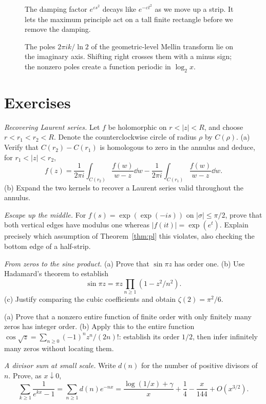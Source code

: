 \begin{figure}[ht]
\centering{}
\caption{The damping factor $e^{\varepsilon s^2}$ decays like $e^{-\varepsilon t^2}$ as we move up a strip. It lets the maximum principle act on a tall finite rectangle before we remove the damping.}
\label{fig:v8c14strip}
\end{figure}
\begin{figure}[ht]
\centering{}
\caption{The poles $2\pi ik/\ln2$ of the geometric-level Mellin transform lie on the imaginary axis. Shifting right crosses them with a minus sign; the nonzero poles create a function periodic in $\log_2x$.}
\label{fig:v8c14poles}
\end{figure}
\section{Exercises}
\begin{exercise}[$\star\star$]\label{ex:annuluscauchy}
\emph{Recovering Laurent series.} Let $f$ be holomorphic on $r<|z|<R$, and choose $r<r_1<r_2<R$. Denote the counterclockwise circle of radius $\rho$ by $C(\rho)$. (a) Verify that $C(r_2)-C(r_1)$ is homologous to zero in the annulus and deduce, for $r_1<|z|<r_2$,
\[f(z)=\frac1{2\pi i}\int_{C(r_2)}\frac{f(w)}{w-z}\dd w
 -\frac1{2\pi i}\int_{C(r_1)}\frac{f(w)}{w-z}\dd w.
\]
(b) Expand the two kernels to recover a Laurent series valid throughout the annulus.
\end{exercise}
\begin{exercise}[$\star$]\label{ex:plsharp}
\emph{Escape up the middle.} For $f(s)=\exp(\exp(-is))$ on $|\sigma|\le\pi/2$, prove that both vertical edges have modulus one whereas $|f(it)|=\exp(e^t)$. Explain precisely which assumption of Theorem~\ref{thm:pl} this violates, also checking the bottom edge of a half-strip.
\end{exercise}
\begin{exercise}[$\star\star$]\label{ex:sinprod}
\emph{From zeros to the sine product.} (a) Prove that $\sin\pi z$ has order one. (b) Use Hadamard's theorem to establish
\[\sin\pi z=\pi z\prod_{n\ge1}(1-z^2/n^2).\]
(c) Justify comparing the cubic coefficients and obtain $\zeta(2)=\pi^2/6$.
\end{exercise}
\begin{exercise}[$\star\star$]\label{ex:nonintorder}
(a) Prove that a nonzero entire function of finite order with only finitely many zeros has integer order. (b) Apply this to the entire function $\cos\sqrt z=\sum_{n\ge0}(-1)^nz^n/(2n)!$: establish its order $1/2$, then infer infinitely many zeros without locating them.
\end{exercise}
\begin{exercise}[$\star\star$]\label{ex:lambert}
\emph{A divisor sum at small scale.} Write $d(n)$ for the number of positive divisors of $n$. Prove, as $x\downarrow0$,
\[\sum_{k\ge1}\frac1{e^{kx}-1}=\sum_{n\ge1}d(n)e^{-nx}
 =\frac{\log(1/x)+\gamma}{x}+\frac14-\frac{x}{144}+O(x^{3/2}).\]
\end{exercise}

